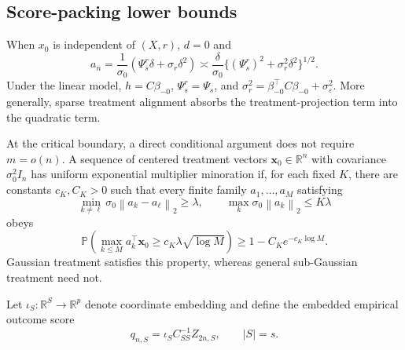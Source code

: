 \documentclass[a4paper,11pt,english]{article}
\newcommand{\Prob}{\mathbb P}
\newcommand{\norm}[1]{\left\lVert #1\right\rVert}
\newcommand{\R}{\mathbb R}
\begin{document}
\subsection{Score-packing lower bounds}

When $x_0$ is independent of $(X,r)$, $d=0$ and
\begin{equation}\label{eq:experimental-upper-scale}
        a_n
        =\frac1{\sigma_0}(\Psi_s^r\delta+\sigma_r\delta^2)
        \asymp
        \frac{\delta}{\sigma_0}
        \{(\Psi_s^r)^2+\sigma_r^2\delta^2\}^{1/2}.
\end{equation}
Under the linear model, $h=C\beta_{-0}$,
$\Psi_s^r=\Psi_s$, and
$\sigma_r^2=\beta_{-0}^\top C\beta_{-0}+\sigma_\varepsilon^2$.
More generally, sparse treatment alignment absorbs the
treatment-projection term into the quadratic term.

At the critical boundary, a direct conditional argument does not require
$m=o(n)$.  A sequence of centered treatment vectors
$\mathbf x_0\in\R^n$ with covariance $\sigma_0^2I_n$ has uniform exponential
multiplier minoration if, for each fixed $K$, there are constants
$c_K,C_K>0$ such that every finite family $a_1,\ldots,a_M$ satisfying
\begin{equation}\label{eq:multiplier-minoration-geometry}
        \min_{k\ne\ell}\sigma_0\norm{a_k-a_\ell}_2\ge\lambda,
        \qquad
        \max_k\sigma_0\norm{a_k}_2\le K\lambda
\end{equation}
obeys
\begin{equation}\label{eq:multiplier-minoration}
        \Prob\left(
        \max_{k\le M}a_k^\top\mathbf x_0
        \ge c_K\lambda\sqrt{\log M}\right)
        \ge1-C_Ke^{-c_K\log M}.
\end{equation}
Gaussian treatment satisfies this property, whereas general
sub-Gaussian treatment need not.

Let $\iota_S:\R^S\to\R^p$ denote coordinate embedding and define the
embedded empirical outcome score
\begin{equation}\label{eq:embedded-outcome-score}
        q_{n,S}=\iota_SC_{SS}^{-1}Z_{2n,S},
        \qquad |S|=s.
\end{equation}
\end{document}
